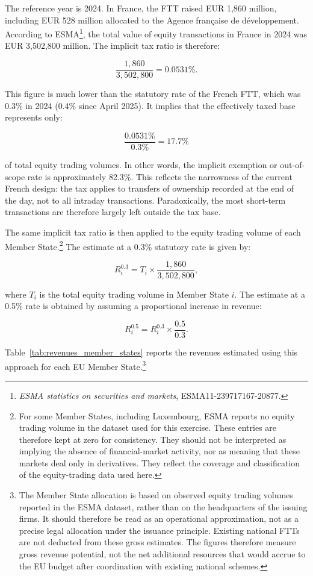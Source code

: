\documentclass[../../main]{subfiles}
\begin{document}
The reference year is 2024. In France, the FTT raised EUR 1,860 million, including EUR 528 million allocated to the Agence française de développement. According to ESMA\footnote{\textit{ESMA statistics on securities and markets}, ESMA11-239717167-20877.}, the total value of equity transactions in France in 2024 was EUR 3,502,800 million. The implicit tax ratio is therefore:

\[
\frac{1,860}{3,502,800} = 0.0531\%.
\]

This figure is much lower than the statutory rate of the French FTT, which was 0.3\% in 2024 (0.4\% since April 2025). It implies that the effectively taxed base represents only:

\[
\frac{0.0531\%}{0.3\%} = 17.7\%
\]

\noindent of total equity trading volumes. In other words, the implicit exemption or out-of-scope rate is approximately 82.3\%. This reflects the narrowness of the current French design: the tax applies to transfers of ownership recorded at the end of the day, not to all intraday transactions. Paradoxically, the most short-term transactions are therefore largely left outside the tax base.

The same implicit tax ratio is then applied to the equity trading volume of each Member State.\footnote{For some Member States, including Luxembourg, ESMA reports no equity trading volume in the dataset used for this exercise. These entries are therefore kept at zero for consistency. They should not be interpreted as implying the absence of financial-market activity, nor as meaning that these markets deal only in derivatives. They reflect the coverage and classification of the equity-trading data used here.} The estimate at a 0.3\% statutory rate is given by:

\[
R_i^{0.3} = T_i \times \frac{1,860}{3,502,800},
\]

\noindent where \(T_i\) is the total equity trading volume in Member State \(i\). The estimate at a 0.5\% rate is obtained by assuming a proportional increase in revenue:

\[
R_i^{0.5} = R_i^{0.3} \times \frac{0.5}{0.3}.
\]

Table~\ref{tab:revenues_member_states} reports the revenues estimated using this approach for each EU Member State.\footnote{The Member State allocation is based on observed equity trading volumes reported in the ESMA dataset, rather than on the headquarters of the issuing firms. It should therefore be read as an operational approximation, not as a precise legal allocation under the issuance principle. Existing national FTTs are not deducted from these gross estimates. The figures therefore measure gross revenue potential, not the net additional resources that would accrue to the EU budget after coordination with existing national schemes.} 
\end{document}
